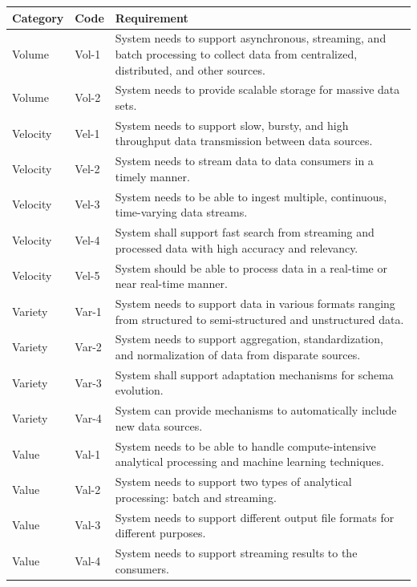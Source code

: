 \documentclass[preprint,12pt]{elsarticle}
\begin{document}
\renewcommand{\arraystretch}{1.5}
\begin{longtable}{|p{2cm}|p{1cm}|p{9cm}|}
    \hline
    \textbf{Category} & \textbf{Code} & \textbf{Requirement} \\
    \hline
    \endhead
    Volume & Vol-1 & System needs to support asynchronous, streaming, and batch processing to collect data from centralized, distributed, and other sources. \\
    \hline
    Volume & Vol-2 & System needs to provide scalable storage for massive data sets. \\
    \hline
    Velocity & Vel-1 & System needs to support slow, bursty, and high throughput data transmission between data sources. \\
    \hline
    Velocity & Vel-2 & System needs to stream data to data consumers in a timely manner. \\
    \hline
    Velocity & Vel-3 & System needs to be able to ingest multiple, continuous, time-varying data streams. \\
    \hline
    Velocity & Vel-4 & System shall support fast search from streaming and processed data with high accuracy and relevancy. \\
    \hline
    Velocity & Vel-5 & System should be able to process data in a real-time or near real-time manner. \\
    \hline
    Variety & Var-1 & System needs to support data in various formats ranging from structured to semi-structured and unstructured data. \\
    \hline
    Variety & Var-2 & System needs to support aggregation, standardization, and normalization of data from disparate sources. \\
    \hline
    Variety & Var-3 & System shall support adaptation mechanisms for schema evolution. \\
    \hline
    Variety & Var-4 & System can provide mechanisms to automatically include new data sources. \\
    \hline
    Value & Val-1 & System needs to be able to handle compute-intensive analytical processing and machine learning techniques. \\
    \hline
    Value & Val-2 & System needs to support two types of analytical processing: batch and streaming. \\
    \hline
    Value & Val-3 & System needs to support different output file formats for different purposes. \\
    \hline
    Value & Val-4 & System needs to support streaming results to the consumers. \\

\end{longtable}
\end{document}
